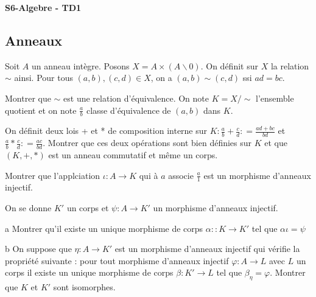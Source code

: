 \documentclass[french]{report}
\begin{document}
\begin{center}
    \huge{\textbf{S6-Algebre - TD1}}
\end{center}

\subsection*{Anneaux}

\begin{exo}
    Soit \(A\) un anneau intègre. Posons \(X=A\times (A\backslash {0})\).
    On définit sur \(X\) la relation \(\sim\) ainsi. Pour tous
    \((a,b), (c,d)\in X\), on a \((a,b)\sim(c,d)\) ssi \(ad = bc\).

    \begin{q}{1}
        Montrer que \(\sim\) est une relation d'équivalence.
        On note \(K=X/\sim\) l'ensemble quotient et on note \(\frac{a}{b}\)
        classe d'équivalence de \((a, b)\) dans \(K\).
    \end{q}
    \begin{q}{2}
        On définit deux lois + et * de composition interne sur \(K\colon
        \frac{a}{b}+\frac{c}{d} \colon=\frac{ad+bc}{bd}\) et \(\frac{a}{b}*\frac{c}{d}
        \colon=\frac{ac}{bd}\). Montrer que ces deux opérations sont bien définies sur
        \(K\) et que \(\left(K, +, *\right)\) est un anneau commutatif et même un corps.
    \end{q}
    \begin{q}{3}
        Montrer que l'applciation \(\iota\colon A\to K\) qui à \(a\) associe \(\frac{a}{1}\)
        est un morphisme d'anneaux injectif.
    \end{q}
    \begin{q}{4}
        On se donne \(K'\) un corps et \(\psi\colon A\to K'\) un morphisme d'anneaux
        injectif.
        \begin{q}{a}
            Montrer qu'il existe un unique morphisme de corps \(\alpha\colon:K\to K'\)
            tel que \(\alpha\iota=\psi\)
        \end{q}
        \begin{q}{b}
            On suppose que \(\eta\colon A\to K'\) est un morphisme d'anneaux injectif qui
            vérifie la propriété suivante : pour tout morphisme d'anneaux injectif \(\varphi
            \colon A\to L\) avec \(L\) un corps il existe un unique morphisme de corps
            \(\beta\colon K'\to L\) tel que \(\beta_\eta=\varphi\).
            Montrer que \(K\) et \(K'\) sont isomorphes.
        \end{q}
    \end{q}
\end{exo}
\end{document}
